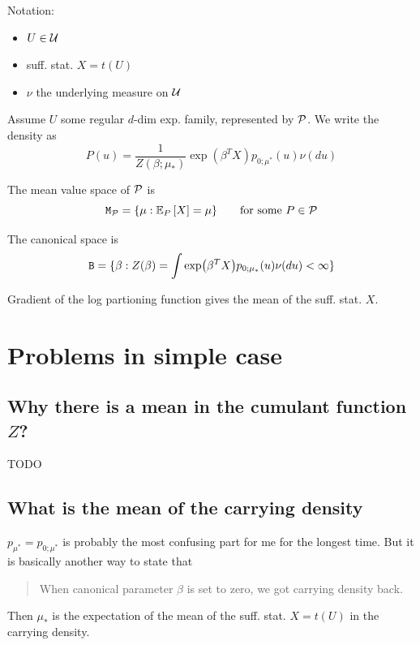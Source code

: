 \newpage

Notation:
\begin{itemize}
	\item $U\in\mathcal{U}$
	\item suff. stat. $X=t(U)$
	\item $\nu$ the underlying measure on $\mathcal{U}$
\end{itemize}

Assume $U$ some regular $d$-dim exp. family, represented by $\mathcal{P}$.
We write the density as
\begin{equation*}
	P(u) = \frac{1}{Z(\beta;\mu_*)} \exp(\beta^T X) p_{0;\mu^*}(u) \nu(du)
\end{equation*}

The mean value space of $\mathcal{P}$ is
\begin{equation*}
	\Mt_\Pc = \{\mu : \ERWi{P}{X} = \mu\} \qquad \text{for some } P \in \Pc
\end{equation*}

The canonical space is
\begin{equation*}
	\Bt = \{\beta : Z(\beta) = \int \exp(\beta^T X) p_{0;\mu_*}(u) \nu(du) < \infty \}
\end{equation*}

Gradient of the log partioning function gives the mean of the suff. stat. $X$.


\section{Problems in simple case}



\subsection{Why there is a mean in the cumulant function $Z$?}

TODO

\subsection{What is the mean of the carrying density}

$p_{\mu^*} = p_{0;\mu^*}$ is probably the most confusing part for me for the longest time.
But it is basically another way to state that
\begin{quote}
	When canonical parameter $\beta$ is set to zero,
	we got carrying density back.
\end{quote}

Then $\mu_*$ is the expectation of the mean of the suff. stat. $X=t(U)$
in the carrying density. 

